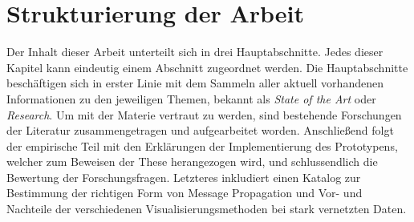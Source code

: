 \section{Strukturierung der Arbeit}

Der Inhalt dieser Arbeit unterteilt sich in drei Hauptabschnitte. Jedes dieser Kapitel kann eindeutig einem Abschnitt zugeordnet werden. Die Hauptabschnitte beschäftigen sich in erster Linie mit dem Sammeln aller aktuell vorhandenen Informationen zu den jeweiligen Themen, bekannt als \emph{State of the Art} oder \emph{Research}. Um mit der Materie vertraut zu werden, sind bestehende Forschungen der Literatur zusammengetragen und aufgearbeitet worden. Anschließend folgt der empirische Teil mit den Erklärungen der Implementierung des Prototypens, welcher zum Beweisen der These herangezogen wird, und schlussendlich die Bewertung der Forschungsfragen. Letzteres inkludiert einen Katalog zur Bestimmung der richtigen Form von Message Propagation und Vor- und Nachteile der verschiedenen Visualisierungsmethoden bei stark vernetzten Daten.